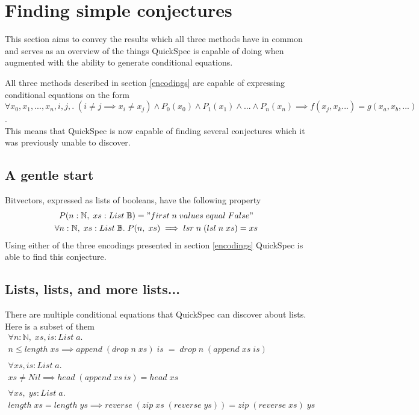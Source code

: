 \section{Finding simple conjectures}
This section aims to convey the results which
all three methods have in common and serves as an overview
of the things QuickSpec is capable of doing when augmented with
the ability to generate conditional equations.

All three methods described in section \ref{encodings}
are capable of expressing conditional equations on the form
\\$\forall x_0, x_1, ..., x_n, i, j,.\;(i \neq j \implies x_i \neq x_j)\wedge P_0(x_0) \wedge P_1(x_1) \wedge ... \wedge P_n(x_n) \implies f(x_j, x_k ...) = g(x_a, x_b, ...)$.\\
This means that QuickSpec is now capable of finding several
conjectures which it was previously unable to discover.

\subsection{A gentle start} \label{bitvector}
    Bitvectors, expressed as lists of booleans,
    have the following property
    \begin{gather*}
        P(n:\mathbb{N},\;xs:List\;\mathbb{B}) = "first\;n\;values\;equal\;False"\\
        \forall n:\mathbb{N},\;xs:List\;\mathbb{B}.\;P(n,\;xs)\implies lsr\;n\;(lsl\;n\;xs)=xs
    \end{gather*}
    Using either of the three encodings presented in section \ref{encodings} QuickSpec
    is able to find this conjecture.

\subsection{Lists, lists, and more lists...}
    There are multiple conditional equations that
    QuickSpec can discover about lists. Here is a subset of them
    \begin{gather*}
        \forall n:\mathbb{N},\; xs, is:List\; a.\\
        n \leq length\; xs \implies append\; (drop\; n\; xs)\; is\; =\; drop\; n\; (append\; xs\; is)\\\\
        \forall xs, is:List\; a.\\
        xs \neq Nil \implies head\; (append\; xs\: is) = head\; xs\\\\
        \forall xs,\; ys:List\; a.\\
        length\; xs = length\; ys \implies reverse\; (zip\; xs\; (reverse\; ys)) = zip\; (reverse\; xs)\; ys
    \end{gather*}

